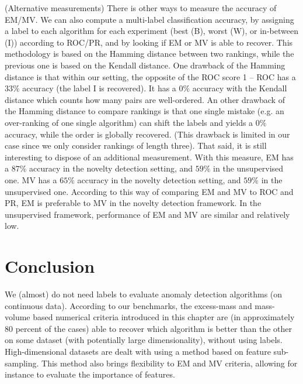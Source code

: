 \begin{remark}(Alternative measurements)
There is other ways to measure the accuracy of EM/MV.
We can also compute a multi-label classification accuracy, by assigning a label to each algorithm for each experiment (best (B), worst (W), or in-between (I)) according to ROC/PR, and by looking if EM or MV is able to recover.
This methodology is based on the Hamming distance between two rankings, while the previous one is based on the Kendall distance. One drawback of the Hamming distance is that within our setting, the opposite of the ROC score 1 – ROC has a $33\%$ accuracy (the label I is recovered). It has a $0\%$ accuracy with the Kendall distance which counts how many pairs are well-ordered. An other drawback of the Hamming distance to compare rankings is that one single mistake (e.g. an over-ranking of one single algorithm) can shift the labels and yields a $0\%$ accuracy, while the order is globally recovered. (This drawback is limited in our case since we only consider rankings of length three).
%
That said, it is still interesting to dispose of an additional measurement. With this measure, 
EM has a $87\%$ accuracy in the novelty detection setting, and $59\%$ in the unsupervised one. MV has a $65\%$ accuracy in the novelty detection setting, and $59\%$ in the unsupervised one.
According to this way of comparing EM and MV to ROC and PR, EM is preferable to MV in the novelty detection framework. In the unsupervised framework, performance of EM and MV are similar and relatively low.
%
\end{remark}




\section{Conclusion}
We (almost) do not need labels to evaluate anomaly detection algorithms (on continuous data). According to our benchmarks, the excess-mass and mass-volume based numerical criteria introduced in this chapter are (in approximately $80$ percent of the cases) able to recover which algorithm is better than the other on some dataset (with potentially large dimensionality), without using labels. High-dimensional datasets are dealt with using a method based on feature sub-sampling. This method also brings flexibility to EM and MV criteria, allowing for instance to evaluate the importance of features.

